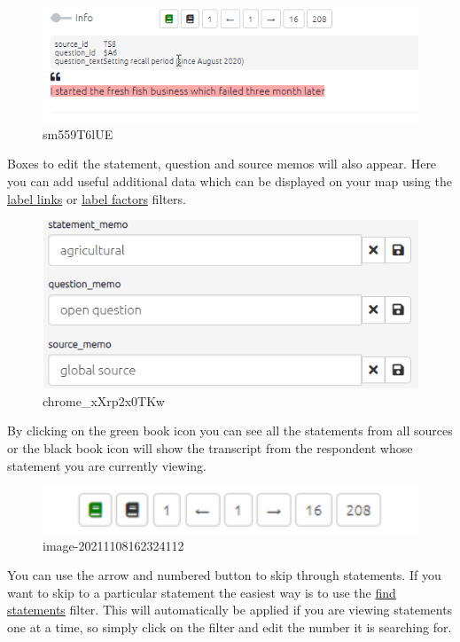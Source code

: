 \documentclass[
]{book}
\begin{document}
\begin{figure}
\centering
\includegraphics{_assets/sm559T6lUE.gif}
\caption{sm559T6lUE}
\end{figure}

Boxes to edit the statement, question and source memos will also appear. Here you can add useful additional data which can be displayed on your map using the \href{xformatting-links}{label links} or \protect\hyperlink{xlabel-factors}{label factors} filters.

\begin{figure}
\centering
\includegraphics[width=6.77083in,height=\textheight]{_assets/chrome_xXrp2x0TKw.png}
\caption{chrome\_xXrp2x0TKw}
\end{figure}

By clicking on the green book icon you can see all the statements from all sources or the black book icon will show the transcript from the respondent whose statement you are currently viewing.

\begin{figure}
\centering
\includegraphics[width=6.77083in,height=\textheight]{_assets/image-20211108162324112.png}
\caption{image-20211108162324112}
\end{figure}

You can use the arrow and numbered button to skip through statements. If you want to skip to a particular statement the easiest way is to use the \href{xfind-statements-links}{find statements} filter. This will automatically be applied if you are viewing statements one at a time, so simply click on the filter and edit the number it is searching for.
\end{document}
